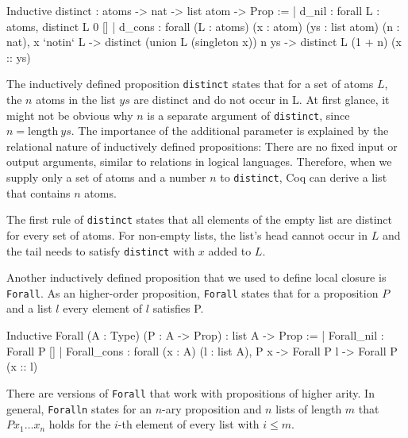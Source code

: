 \documentclass[a4paper, 11pt, fleqn]{scrreprt}
\newcommand{\coqinline}[1]{\texttt{#1}}
\begin{document}
	\begin{coqcode}
Inductive distinct : atoms -> nat -> list atom -> Prop :=
  | d_nil : forall L : atoms, distinct L 0 []
  | d_cons : forall (L : atoms) (x : atom) (ys : list atom) (n : nat),
      x `notin` L -> 
      distinct (union L (singleton x)) n ys -> 
      distinct L (1 + n) (x :: ys)
	\end{coqcode}
	The inductively defined proposition \coqinline{distinct} states that for a set of atoms $L$, the $n$ atoms in the list $ys$ are distinct and do not occur in L. At first glance, it might not be obvious why $n$ is a separate argument of \coqinline{distinct}, since $n = \text{length} \ ys$. The importance of the additional parameter is explained by the relational nature of inductively defined propositions: There are no fixed input or output arguments, similar to relations in logical languages. Therefore, when we supply only a set of atoms and a number $n$ to \coqinline{distinct}, Coq can derive a list that contains $n$ atoms.
	\par
	The first rule of \coqinline{distinct} states that all elements of the empty list are distinct for every set of atoms.
	For non-empty lists, the list's head cannot occur in $L$ and the tail needs to satisfy \coqinline{distinct} with $x$ added to $L$.\\
	\par  \noindent
	Another inductively defined proposition that we used to define local closure is \coqinline{Forall}.
	As an higher-order proposition, \coqinline{Forall} states that for a proposition $P$ and a list $l$ every element of $l$ satisfies P.
	\begin{coqcode}
Inductive Forall (A : Type) (P : A -> Prop) : list A -> Prop :=
  | Forall_nil : Forall P [] 
  | Forall_cons : forall (x : A) (l : list A),
      P x -> 
      Forall P l -> 
      Forall P (x :: l)
	\end{coqcode}
	There are versions of \coqinline{Forall} that work with propositions of higher arity. In general, \coqinline{Foralln} states for an $n$-ary proposition and $n$ lists of length $m$ that $P x_1 \dots x_n$ holds for the $i$-th element of every list with $i \leq m$.
	
\end{document}
